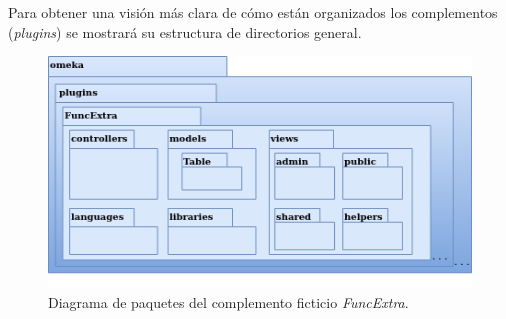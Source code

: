 \documentclass[
]{article}
\begin{document}
Para obtener una visión más clara de cómo están organizados los
complementos (\emph{plugins}) se mostrará su estructura de directorios
general.

\begin{figure}
\hypertarget{da-pck-2}{%
\centering
\includegraphics{../_static/images/pck-2.png}
\caption{Diagrama de paquetes del complemento ficticio
\emph{FuncExtra}.}\label{da-pck-2}
}
\end{figure}
\end{document}
